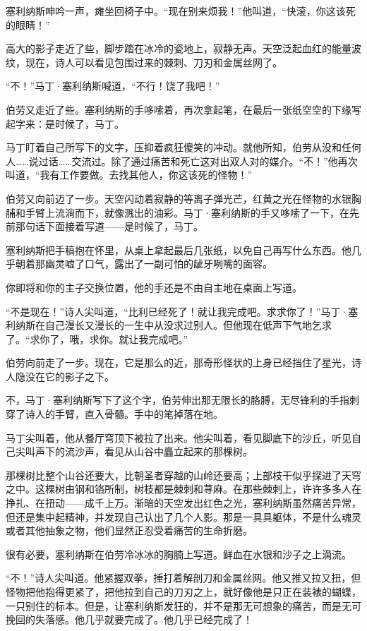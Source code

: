 \documentclass[AutoFakeBold=true]{book}
\begin{document}
塞利纳斯呻吟一声，瘫坐回椅子中。``现在别来烦我！''他叫道，``快滚，你这该死的眼睛！''

高大的影子走近了些，脚步踏在冰冷的瓷地上，寂静无声。天空泛起血红的能量波纹，现在，诗人可以看见包围过来的棘刺、刀刃和金属丝网了。

``不！''马丁·塞利纳斯喊道，``不行！饶了我吧！''

伯劳又走近了些。塞利纳斯的手哆嗦着，再次拿起笔，在最后一张纸空空的下缘写起字来：{\heiti 是时候了，马丁。}

马丁盯着自己所写下的文字，压抑着疯狂傻笑的冲动。就他所知，伯劳从没和任何人……说过话……交流过。除了通过痛苦和死亡这对出双人对的媒介。``不！''他再次叫道，``我有工作要做。去找其他人，你这该死的怪物！''

伯劳又向前迈了一步。天空闪动着寂静的等离子弹光芒，红黄之光在怪物的水银胸脯和手臂上流淌而下，就像溅出的油彩。马丁·塞利纳斯的手又哆嗦了一下，在先前那句话下面接着写道——{\heiti 是时候了，马丁。}

塞利纳斯把手稿抱在怀里，从桌上拿起最后几张纸，以免自己再写什么东西。他几乎朝着那幽灵嘘了口气，露出了一副可怕的龇牙咧嘴的面容。

{\heiti 你即将和你的主子交换位置}，他的手还是不由自主地在桌面上写道。

``不是现在！''诗人尖叫道，``比利已经死了！就让我完成吧。求求你了！''马丁·塞利纳斯在自己漫长又漫长的一生中从没求过别人。但他现在低声下气地乞求了。``求你了，哦，求你。就让我完成吧。''

伯劳向前走了一步。现在，它是那么的近，那奇形怪状的上身已经挡住了星光，诗人隐没在它的影子之下。

{\heiti 不}，马丁·塞利纳斯写下了这个字，伯劳伸出那无限长的胳膊，无尽锋利的手指刺穿了诗人的手臂，直入骨髓。手中的笔掉落在地。

马丁尖叫着，他从餐厅穹顶下被拉了出来。他尖叫着，看见脚底下的沙丘，听见自己尖叫声下的流沙声，看见从山谷中矗立起来的那棵树。

那棵树比整个山谷还要大，比朝圣者穿越的山岭还要高；上部枝干似乎探进了天穹之中。这棵树由钢和铬所制，树枝都是棘刺和荨麻。在那些棘刺上，许许多多人在挣扎、在扭动——成千上万。渐暗的天空发出红色之光，塞利纳斯虽然痛苦异常，但还是集中起精神，并发现自己认出了几个人影。那是一具具躯体，不是什么魂灵或者其他抽象之物，他们显然正忍受着痛苦的生命折磨。

{\heiti 很有必要}，塞利纳斯在伯劳冷冰冰的胸腩上写道。鲜血在水银和沙子之上滴流。

``不！''诗人尖叫道。他紧握双拳，捶打着解剖刀和金属丝网。他又推又拉又扭，但怪物把他抱得更紧了，把他拉到自己的刀刃之上，就好像他是只正在装裱的蝴蝶，一只别住的标本。但是，让塞利纳斯发狂的，并不是那无可想象的痛苦，而是无可挽回的失落感。他几乎就要完成了。他几乎已经完成了！
\end{document}
